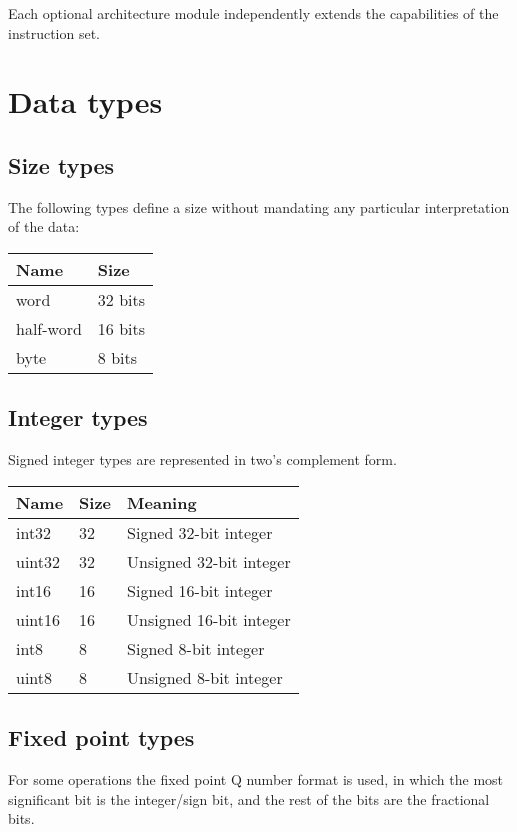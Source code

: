 Each optional architecture module independently extends the capabilities of the
instruction set.

\section{Data types}

\subsection{Size types}

The following types define a size without mandating any particular
interpretation of the data:

\begin{tabular}{|l|l|}
  \hline
  \textbf{Name} & \textbf{Size} \\
  \hline
  word & 32 bits \\
  \hline
  half-word & 16 bits \\
  \hline
  byte & 8 bits \\
  \hline
\end{tabular}

\subsection{Integer types}

Signed integer types are represented in two's complement form.

\begin{tabular}{|l|l|p{140pt}|}
  \hline
  \textbf{Name} & \textbf{Size} & \textbf{Meaning} \\
  \hline
  int32 & 32 & Signed 32-bit integer \\
  \hline
  uint32 & 32 & Unsigned 32-bit integer \\
  \hline
  int16 & 16 & Signed 16-bit integer \\
  \hline
  uint16 & 16 & Unsigned 16-bit integer \\
  \hline
  int8 & 8 & Signed 8-bit integer \\
  \hline
  uint8 & 8 & Unsigned 8-bit integer \\
  \hline
\end{tabular}

\subsection{Fixed point types}

For some operations the fixed point Q number format is used, in which the most
significant bit is the integer/sign bit, and the rest of the bits are the
fractional bits.

